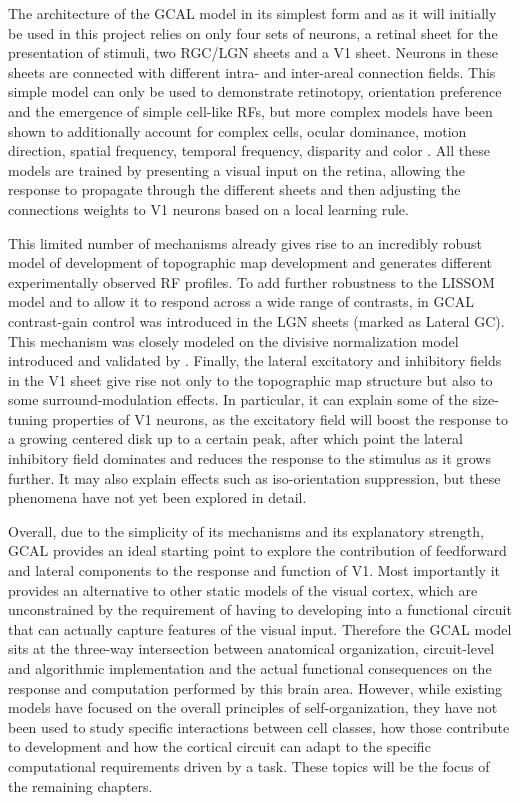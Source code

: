 The architecture of the GCAL model in its simplest form and as it will
initially be used in this project relies on only four sets of neurons,
a retinal sheet for the presentation of stimuli, two RGC/LGN sheets
and a V1 sheet. Neurons in these sheets are connected with different
intra- and inter-areal connection fields. This simple model can only
be used to demonstrate retinotopy, orientation preference and the
emergence of simple cell-like RFs, but more complex models have been
shown to additionally account for complex cells, ocular dominance,
motion direction, spatial frequency, temporal frequency, disparity and
color \citep{Bednar2012a}. All these models are trained by presenting
a visual input on the retina, allowing the response to propagate
through the different sheets and then adjusting the connections
weights to V1 neurons based on a local learning rule.

This limited number of mechanisms already gives rise to an incredibly
robust model of development of topographic map development and
generates different experimentally observed RF profiles. To add
further robustness to the LISSOM model and to allow it to respond
across a wide range of contrasts, in GCAL contrast-gain control was
introduced in the LGN sheets (marked as Lateral GC). This mechanism
was closely modeled on the divisive normalization model introduced and
validated by \cite{Bonin2005}. Finally, the lateral excitatory and
inhibitory fields in the V1 sheet give rise not only to the
topographic map structure but also to some surround-modulation
effects. In particular, it can explain some of the size-tuning
properties of V1 neurons, as the excitatory field will boost the
response to a growing centered disk up to a certain peak, after which
point the lateral inhibitory field dominates and reduces the response
to the stimulus as it grows further.
It may also explain effects such as iso-orientation
suppression, but these phenomena have not yet been explored in detail.

Overall, due to the simplicity of its mechanisms and its explanatory
strength, GCAL provides an ideal starting point to explore the
contribution of feedforward and lateral components to the response and
function of V1. Most importantly it provides an alternative to other
static models of the visual cortex, which are unconstrained by the
requirement of having to developing into a functional circuit that can
actually capture features of the visual input. Therefore the GCAL
model sits at the three-way intersection between anatomical
organization, circuit-level and algorithmic implementation and the
actual functional consequences on the response and computation
performed by this brain area. However, while existing models have
focused on the overall principles of self-organization, they have not
been used to study specific interactions between cell classes, how
those contribute to development and how the cortical circuit can adapt
to the specific computational requirements driven by a task.  These
topics will be the focus of the remaining chapters.
